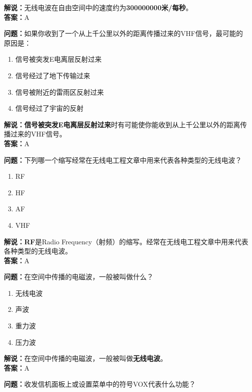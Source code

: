 \textbf{解说：}无线电波在自由空间中的速度约为\textbf{300000000米/每秒}。\\\textbf{答案：}A



\textbf{问题：}如果你收到了一个从上千公里以外的距离传播过来的VHF信号，最可能的原因是：

\begin{enumerate}[label=\Alph*), leftmargin=1cm]
	\item 信号被突发E电离层反射过来
	\item 信号经过了地下传输过来
	\item 信号被附近的雷雨区反射过来
	\item 信号经过了宇宙的反射
\end{enumerate}

\textbf{解说：信号被突发E电离层反射过来}时有可能使你能收到从上千公里以外的距离传播过来的VHF信号。\\\textbf{答案：}A



\textbf{问题：}下列哪一个缩写经常在无线电工程文章中用来代表各种类型的无线电波？

\begin{enumerate}[label=\Alph*), leftmargin=1cm]
	\item RF
	\item HF
	\item AF
	\item VHF
\end{enumerate}

\textbf{解说：RF}是Radio Frequency（射频）的缩写。经常在无线电工程文章中用来代表各种类型的无线电波。\\\textbf{答案：}A



\textbf{问题：}在空间中传播的电磁波，一般被叫做什么？

\begin{enumerate}[label=\Alph*), leftmargin=1cm]
	\item 无线电波
	\item 声波
	\item 重力波
	\item 压力波
\end{enumerate}

\textbf{解说：}在空间中传播的电磁波，一般被叫做\textbf{无线电波}。\\\textbf{答案：}A%



\textbf{问题：}收发信机面板上或设置菜单中的符号VOX代表什么功能？

